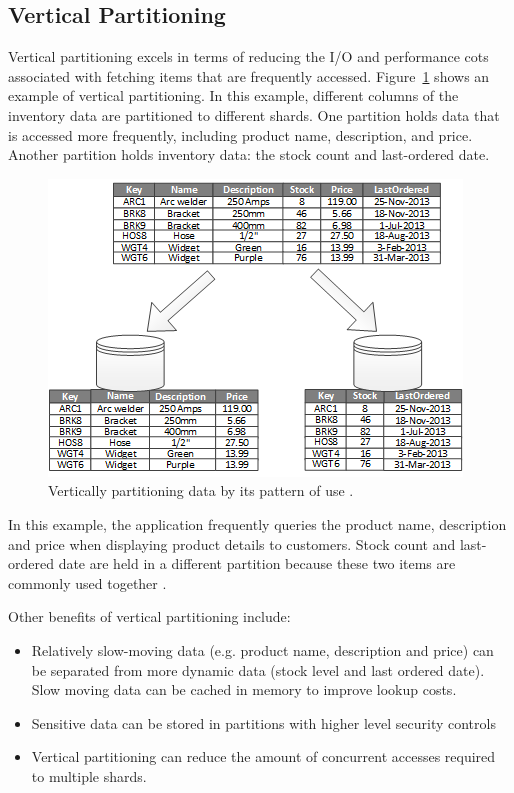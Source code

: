 \subsection{Vertical Partitioning}
Vertical partitioning excels in terms of reducing the I/O and performance cots associated with fetching items that are frequently accessed. Figure~\ref{fig:vertical-partitioning} shows an example of vertical partitioning. In this example, different columns of the inventory data are partitioned to different shards. One partition holds data that is accessed more frequently, including product name, description, and price. Another partition holds inventory data: the stock count and last-ordered date. 
\begin{figure}[h]
  \centering
  \includegraphics{figures/veritical-partitioning.png}
  \caption{Vertically partitioning data by its pattern of use \cite{Datapart51:online}.}
  \label{fig:vertical-partitioning}
\end{figure}

In this example, the application frequently queries the product name, description and price when displaying product details to customers. Stock count and last-ordered date are held in a different partition because these two items are commonly used together \cite{Datapart51:online}.

Other benefits of vertical partitioning include:
\begin{itemize}
    \item Relatively slow-moving data (e.g. product name, description and price) can be separated from more dynamic data (stock level and last ordered date). Slow moving data can be cached in memory to improve lookup costs.
    \item Sensitive data can be stored in partitions with higher level security controls
    \item Vertical partitioning can reduce the amount of concurrent accesses required to multiple shards.
\end{itemize}

